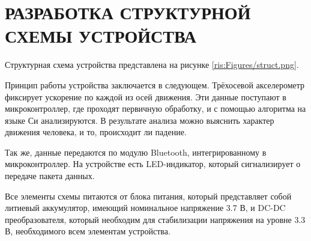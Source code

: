 \begin{sloppypar} %
\newpage %
\section{РАЗРАБОТКА СТРУКТУРНОЙ СХЕМЫ УСТРОЙСТВА} %
Структурная схема устройства представлена на рисунке \ref{ris:Figures/struct.png}.

Принцип работы устройства заключается в следующем. Трёхосевой акселерометр фиксирует ускорение по каждой из осей движения. Эти данные поступают в микроконтроллер, где  проходят первичную обработку, и с помощью алгоритма на языке Си анализируются. В результате анализа можно выяснить характер движения человека, и то,  происходит ли падение. 


Так же, данные передаются по модулю Bluetooth, интегрированному в микроконтроллер. На устройстве есть LED-индикатор, который сигнализирует о передаче пакета данных. 

Все элементы схемы питаются от блока питания, который представляет собой литиевый аккумулятор, имеющий номинальное напряжение 3.7 В, и DC-DC преобразователя, который необходим для стабилизации напряжения на уровне 3.3 В, необходимого всем элементам устройства.

\end{sloppypar}
